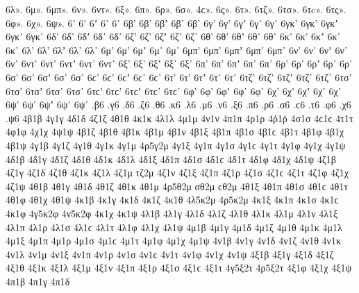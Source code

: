 {6λ». 
6μ».
6μπ». 
6ν».
6ντ». 
6ξ». 
6π». 
6ρ». 
6σ». 4ϲ». 
6ς». 
6τ». 
6τζ».
6τσ». 6τc».
6τς».
6φ». 
6χ». 
6ψ».
6' 6’ 6ʼ 6᾽ 6᾿ 
6β' 6β’ 6βʼ 6β᾽ 6β᾿ 
6γ' 6γ’ 6γʼ 6γ᾽ 6γ᾿ 
6γκ' 6γκ’ 6γκʼ 6γκ᾽ 6γκ᾿ 
6δ' 6δ’ 6δʼ 6δ᾽ 6δ᾿ 
6ζ' 6ζ’ 6ζʼ 6ζ᾽ 6ζ᾿ 
6θ' 6θ’ 6θʼ 6θ᾽ 6θ᾿ 
6κ' 6κ’ 6κʼ 6κ᾽ 6κ᾿ 
6λ' 6λ’ 6λʼ 6λ᾽ 6λ᾿ 
6μ' 6μ’ 6μʼ 6μ᾽ 6μ᾿ 
6μπ' 6μπ’ 6μπʼ 6μπ᾽ 6μπ᾿ 
6ν' 6ν’ 6νʼ 6ν᾽ 6ν᾿ 
6ντ' 6ντ’ 6ντʼ 6ντ᾽ 6ντ᾿ 
6ξ' 6ξ’ 6ξʼ 6ξ᾽ 6ξ᾿ 
6π' 6π’ 6πʼ 6π᾽ 6π᾿ 
6ρ' 6ρ’ 6ρʼ 6ρ᾽ 6ρ᾿ 
6σ' 6σ’ 6σʼ 6σ᾽ 6σ᾿ 6ϲ' 6ϲ’ 6ϲʼ 6ϲ᾽ 6ϲ᾿ 
6τ' 6τ’ 6τʼ 6τ᾽ 6τ᾿ 
6τζ' 6τζ’ 6τζʼ 6τζ᾽ 6τζ᾿ 
6τσ' 6τσ’ 6τσʼ 6τσ᾽ 6τσ᾿ 6τϲ' 6τϲ’ 6τϲʼ 6τϲ᾽ 6τϲ᾿ 
6φ' 6φ’ 6φʼ 6φ᾽ 6φ᾿ 
6χ' 6χ’ 6χʼ 6χ᾽ 6χ᾿ 
6ψ' 6ψ’ 6ψʼ 6ψ᾽ 6ψ᾿ 
.β6 
.γ6 
.δ6 
.ζ6 
.θ6 
.κ6 
.λ6 
.μ6 
.ν6 
.ξ6 
.π6 
.ρ6 
.σ6 .ϲ6 
.τ6 
.φ6 
.χ6 
.ψ6 
4β1β 
4γ1γ 
4δ1δ 
4ζ1ζ 
4θ1θ 
4κ1κ 
4λ1λ 
4μ1μ 
4ν1ν 
4π1π 
4ρ1ρ 
4ῤ1ῥ 
4σ1σ 4ϲ1ϲ 
4τ1τ 
4φ1φ 
4χ1χ 
4ψ1ψ 
4β1ζ 
4β1θ 
4β1κ 
4β1μ 
4β1ν 
4β1ξ 
4β1π 
4β1σ 4β1ϲ 
4β1τ 
4β1φ 
4β1χ 
4β1ψ 
4γ1β 
4γ1ζ 
4γ1θ 
4γ1κ 
4γ1μ 
4ρ5γ2μ   %
4γ1ξ 
4γ1π 
4γ1σ 4γ1ϲ 
4γ1τ 
4γ1φ 
4γ1χ 
4γ1ψ 
4δ1β 
4δ1γ 
4δ1ζ 
4δ1θ 
4δ1κ 
4δ1λ 
4δ1ξ 
4δ1π 
4δ1σ 4δ1ϲ 
4δ1τ 
4δ1φ 
4δ1χ 
4δ1ψ 
4ζ1β   %
4ζ1γ   %
4ζ1δ 
4ζ1θ 
4ζ1κ 
4ζ1λ 
4ζ1μ 
τζ2μ   %
4ζ1ν 
4ζ1ξ 
4ζ1π 
4ζ1ρ 
4ζ1σ 4ζ1ϲ 
4ζ1τ 
4ζ1φ 
4ζ1χ 
4ζ1ψ 
4θ1β 
4θ1γ 
4θ1δ 
4θ1ζ 
4θ1κ 
4θ1μ 
4ρ5θ2μ   %
σθ2μ ϲθ2μ   %
4θ1ξ 
4θ1π 
4θ1σ 4θ1ϲ 
4θ1τ 
4θ1φ 
4θ1χ 
4θ1ψ 
4κ1β   %
4κ1γ 
4κ1δ 
4κ1ζ 
4κ1θ 
4λ5κ2μ   %
4ρ5κ2μ   %
4κ1ξ 
4κ1π 
4κ1σ 4κ1ϲ 
4κ1φ 
4γ5κ2φ   %
4ν5κ2φ   %
4κ1χ 
4κ1ψ 
4λ1β 
4λ1γ 
4λ1δ 
4λ1ζ 
4λ1θ 
4λ1κ 
4λ1μ 
4λ1ν 
4λ1ξ 
4λ1π 
4λ1ρ 
4λ1σ 4λ1ϲ 
4λ1τ 
4λ1φ 
4λ1χ 
4λ1ψ 
4μ1β 
4μ1γ 
4μ1δ 
4μ1ζ 
4μ1θ 
4μ1κ 
4μ1λ 
4μ1ξ 
4μ1π 
4μ1ρ 
4μ1σ 4μ1ϲ 
4μ1τ 
4μ1φ 
4μ1χ 
4μ1ψ 
4ν1β 
4ν1γ 
4ν1δ 
4ν1ζ 
4ν1θ 
4ν1κ 
4ν1λ 
4ν1μ 
4ν1ξ 
4ν1π 
4ν1ρ 
4ν1σ 4ν1ϲ 
4ν1τ 
4ν1φ 
4ν1χ 
4ν1ψ 
4ξ1β 
4ξ1γ 
4ξ1δ 
4ξ1ζ 
4ξ1θ 
4ξ1κ 
4ξ1λ 
4ξ1μ 
4ξ1ν 
4ξ1π 
4ξ1ρ 
4ξ1σ 4ξ1ϲ 
4ξ1τ 
4γ5ξ2τ   %
4ρ5ξ2τ   %
4ξ1φ 
4ξ1χ 
4ξ1ψ 
4π1β 
4π1γ 
4π1δ 
}
